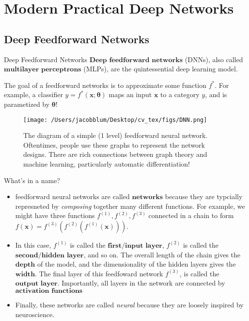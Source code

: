 \documentclass{beamer}
\begin{document}
\section{Modern Practical Deep Networks}
\subsection{Deep Feedforward Networks}
\begin{frame}[plain]{Deep Feedforward Networks}
    \small{$\textbf{Deep feedforward networks}$ (DNNs), also called $\textbf{multilayer perceptrons}$ (MLPs), are the quintessential deep learning model.} 

    \small{The goal of a feedforward networks is to approximate some function $f^{*}$. For example, a classifier $y = f^{*}(\mathbf{x}; \boldsymbol{\theta})$ maps an input $\mathbf{x}$ to a category $y$, and is parametized by $\boldsymbol{\theta}$!}
\begin{figure}
    \centering
    \texttt{[image: /Users/jacobblum/Desktop/cv\_tex/figs/DNN.png]}
    \caption{The diagram of a simple (1 level) feedforward neural network. Oftentimes, people use these graphs to represent the network designs. There are rich connections between
    graph theory and machine learning, particularly automatic differentiation!}
\end{figure}

\end{frame}

\begin{frame}[plain]{What's in a name?}

\begin{itemize}
    \item \small{feedforward neural networks are called $\textbf{networks}$ because they are typcially represneted by \textit{composing} together many different functions.}
           \small{For example, we might have three functions $f^{(1)}, f^{(2)}, f^{(3)}$ connected in a chain to form $f(\mathbf{x}) = f^{(3)}(f^{(2)}(f^{(1)}(\mathbf{x})))$.}

    \item \small{In this case, $f^{(1)}$ is called the $\textbf{first/input layer}$, $f^{(2)}$ is called the $\textbf{second/hidden layer}$, and so on. 
                The overall length of the chain gives the $\mathbf{depth}$ of the model, and the dimensionality of the hidden layers gives the $\mathbf{width}$. The final layer of this feedfoward network $f^{(3)}$, is called the $\textbf{output layer}$. Importantly,
                all layers in the network are connected by $\textbf{activation functions}$}

    \item \small{Finally, these networks are called \textit{neural} because they are loosely inspired by neuroscience.}
\end{itemize}
\end{frame}
\end{document}
